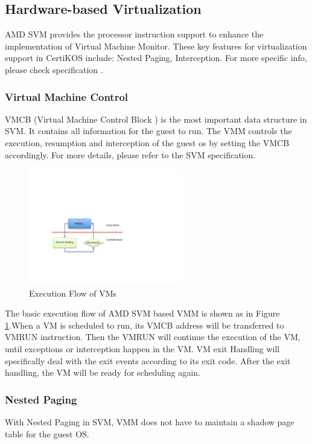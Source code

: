 \documentclass[a4paper,12pt]{article}
\begin{document}
\subsection{ Hardware-based Virtualization}
AMD SVM provides the processor instruction support to enhance the implementation of Virtual Machine Monitor. These key features for virtualization support in CertiKOS include:  Nested Paging,  Interception.  For more specific info, please check specification \cite{AMD64, AMDSVM}.

\subsubsection{Virtual Machine Control}
VMCB  (Virtual Machine Control Block ) is the most important data structure in SVM.  It contains all information for the guest to run.  The VMM controls the  execution, resumption and interception of the guest os by setting the VMCB accordingly.  For more details, please refer to the SVM specification. 

\begin{figure}[!ht]
 \centerline{
 \includegraphics[width=0.6\textwidth]{vm_flow}}
 \caption{Execution Flow of VMs} \label{fig:vmflow}
\end{figure}


The basic execution flow of AMD SVM based VMM is shown as in Figure \ref{fig:vmflow}.When a VM is scheduled to run, its VMCB address will  be transferred to VMRUN instruction. Then the VMRUN will continue the execution of the VM, until exceptions or interception happen in the VM.   VM exit Handling will specifically deal with the exit events according to its exit code. After the exit handling, the VM will be ready for scheduling again.



\subsubsection{Nested Paging}
With Nested Paging in SVM, VMM does not  have to maintain a shadow page table for the guest OS.  
\end{document}
